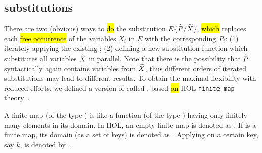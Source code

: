 \subsection{\Multivariate substitutions}

There are two (obvious) ways to \hl{do} %
the \multivariate substitution $E\{\widetilde P/\widetilde X\}$, \hl{which} replaces each \hl{free
occurrence} of the variables $X_i$ in $E$ with the corresponding
$P_i$: (1) iterately applying the existing \univariate
{}; (2) defining a new \multivariate substitution
function which substitutes all variables $\widetilde X$ in parallel.
Note that there is the
possibility that $\widetilde P$ syntactically again contains variables from $\widetilde X$, thus
different orders of iterated substitutions may lead to different results.
To obtain the maximal flexibility with reduced efforts, we defined
a \multivariate version of 
called , based \hl{on} HOL
\texttt{finite\_map} theory~\cite{holdesc}.

A finite map (of the type \HOLinline{\ensuremath{\alpha} \HOLTokenMapto{} \ensuremath{\beta}}) is like a function (of the type
\HOLinline{\ensuremath{\alpha} \HOLTokenTransEnd \ensuremath{\beta}}) having only finitely many elements in its
domain. In HOL, an empty finite map is denoted as .
If  is a finite map, its domain (as a set of keys) is denoted as
. Applying  on a certain key, say $k$, is denoted
by .

